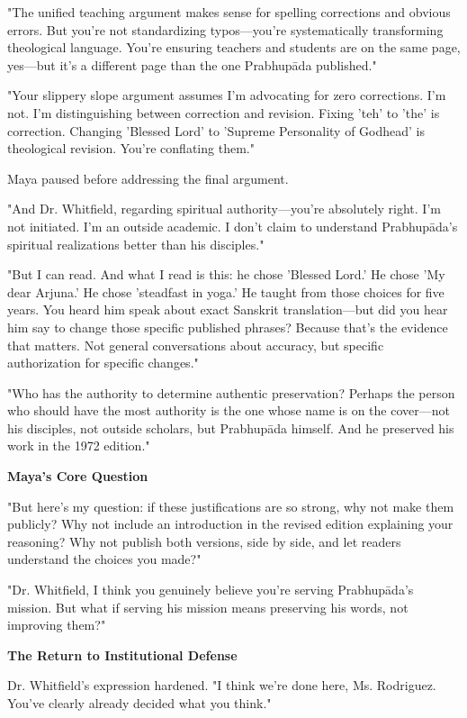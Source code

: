 \documentclass[12pt,twoside]{book}
\begin{document}
"The unified teaching argument makes sense for spelling corrections and obvious errors. But you're not standardizing typos—you're systematically transforming theological language. You're ensuring teachers and students are on the same page, yes—but it's a different page than the one Prabhupāda published."

"Your slippery slope argument assumes I'm advocating for zero corrections. I'm not. I'm distinguishing between correction and revision. Fixing 'teh' to 'the' is correction. Changing 'Blessed Lord' to 'Supreme Personality of Godhead' is theological revision. You're conflating them."

Maya paused before addressing the final argument.

"And Dr. Whitfield, regarding spiritual authority—you're absolutely right. I'm not initiated. I'm an outside academic. I don't claim to understand Prabhupāda's spiritual realizations better than his disciples."

"But I can read. And what I read is this: he chose 'Blessed Lord.' He chose 'My dear Arjuna.' He chose 'steadfast in yoga.' He taught from those choices for five years. You heard him speak about exact Sanskrit translation—but did you hear him say to change those specific published phrases? Because that's the evidence that matters. Not general conversations about accuracy, but specific authorization for specific changes."

"Who has the authority to determine authentic preservation? Perhaps the person who should have the most authority is the one whose name is on the cover—not his disciples, not outside scholars, but Prabhupāda himself. And he preserved his work in the 1972 edition."

\textbf{\textbf{Maya's Core Question}}

"But here's my question: if these justifications are so strong, why not make them publicly? Why not include an introduction in the revised edition explaining your reasoning? Why not publish both versions, side by side, and let readers understand the choices you made?"

"Dr. Whitfield, I think you genuinely believe you're serving Prabhupāda's mission. But what if serving his mission means preserving his words, not improving them?"

\textbf{\textbf{The Return to Institutional Defense}}

Dr. Whitfield's expression hardened. "I think we're done here, Ms. Rodriguez. You've clearly already decided what you think."
\end{document}
